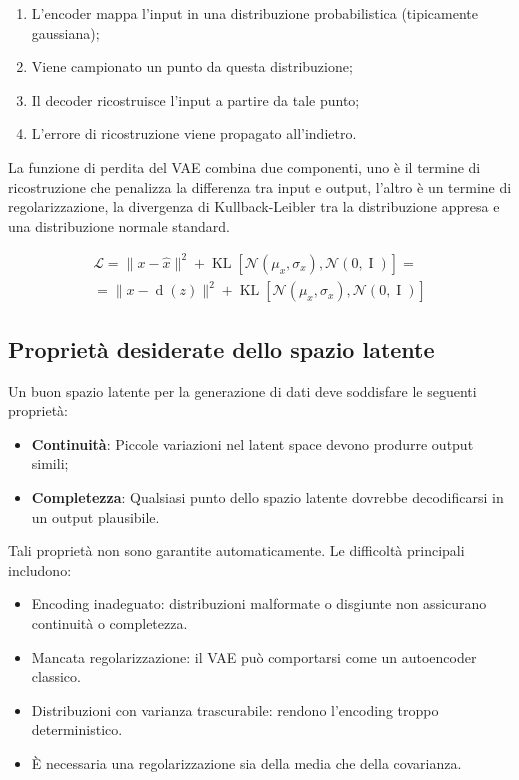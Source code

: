 \begin{enumerate}
\item L’encoder mappa l’input in una distribuzione probabilistica (tipicamente gaussiana);
\item Viene campionato un punto da questa distribuzione;
\item Il decoder ricostruisce l’input a partire da tale punto;
\item L’errore di ricostruzione viene propagato all’indietro.
\end{enumerate}

La funzione di perdita del VAE combina due componenti, uno è il termine di ricostruzione che penalizza la differenza tra input e output, l'altro è un termine di regolarizzazione, la divergenza di Kullback-Leibler tra la distribuzione appresa e una distribuzione normale standard.

\begin{equation}\begin{split}
\mathcal{L} = \| x - \hat{x}\|^2 + \operatorname{KL}[\mathcal{N}(\mu_x,\sigma_x), \mathcal{N}(0,\operatorname{I})] =\\= \|x-\operatorname{d}(z)\|^2 + \operatorname{KL}[\mathcal{N}(\mu_x,\sigma_x), \mathcal{N}(0, \operatorname{I})]
\end{split}
\end{equation}

\subsection{Proprietà desiderate dello spazio latente}

Un buon spazio latente per la generazione di dati deve soddisfare le seguenti proprietà:

\begin{itemize}
\item \textbf{Continuità}: Piccole variazioni nel latent space devono produrre output simili;
\item \textbf{Completezza}: Qualsiasi punto dello spazio latente dovrebbe decodificarsi in un output plausibile.
\end{itemize}

Tali proprietà non sono garantite automaticamente. Le difficoltà principali includono:

\begin{itemize}
\item Encoding inadeguato: distribuzioni malformate o disgiunte non assicurano continuità o completezza.
\item Mancata regolarizzazione: il VAE può comportarsi come un autoencoder classico.
\item Distribuzioni con varianza trascurabile: rendono l’encoding troppo deterministico.
\item È necessaria una regolarizzazione sia della media che della covarianza.
\end{itemize}

